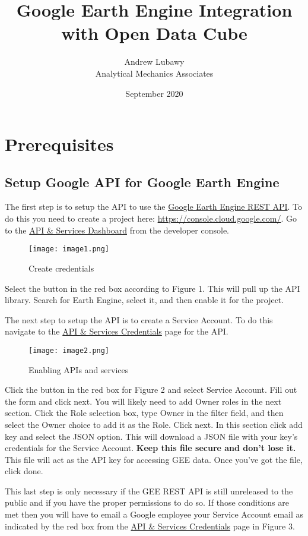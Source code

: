\documentclass{article}
\title{Google Earth Engine Integration with Open Data Cube}
\author{Andrew Lubawy\\ Analytical Mechanics Associates}
\date{September 2020}
\begin{document}
\maketitle
\tableofcontents

\part{Prerequisites}
\chapter{Setup Google API for Google Earth Engine}
The first step is to setup the API to use the
\href{https://developers.google.com/earth-engine/reference}{Google Earth Engine
REST API}. To do
this you need to create a project here:
\url{https://console.cloud.google.com/}. Go to the
\href{https://console.cloud.google.com/apis/dashboard}{API \& Services
Dashboard}
from the developer console.

\begin{figure}
	\caption{Create credentials}
	\texttt{[image: image1.png]}
\end{figure}

Select the button in the red box according to Figure 1. This will pull up the
API library. Search for Earth Engine, select it, and then enable it for the
project.

The next step to setup the API is to create a Service Account. To do this
navigate to the
\href{https://console.cloud.google.com/apis/api/earthengine.googleapis.com/credentials}{API
\& Services Credentials} page for the API.

\begin{figure}
	\caption{Enabling APIs and services}
	\texttt{[image: image2.png]}
\end{figure}

Click the button in the red box for Figure 2 and select Service Account. Fill
out the form
and click next. You will likely need to add Owner roles in the next section.
Click the Role selection box, type Owner in the filter field, and then select
the Owner choice to add it as the Role. Click next. In this section click add
key and select the JSON option. This will download a JSON file with your key’s
credentials for the Service Account. \textbf{Keep this file secure and don’t
lose it.} This file will act as the API key for accessing GEE data. Once
you’ve got the file, click done.

This last step is only necessary if the GEE REST API is still unreleased to the
public and if you have the proper permissions to do so. If those conditions are
met then you will have to email a Google employee your Service Account email as
indicated by the red box from the
\href{https://console.cloud.google.com/apis/api/earthengine.googleapis.com/credentials}{API
\& Services Credentials} page in Figure 3.
\end{document}
